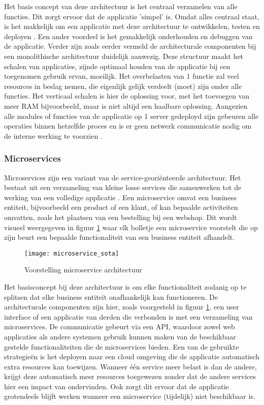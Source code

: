 Het basis concept van deze architectuur is het centraal verzamelen van alle functies. Dit zorgt ervoor dat de applicatie 'simpel' is. Omdat alles centraal staat, is het makkelijk om een applicatie met deze architectuur te ontwikkelen, testen en deployen \autocite{Hou2023}. Een ander voordeel is het gemakkelijk onderhouden en debuggen van de applicatie. Verder zijn zoals eerder vermeld de architecturale componenten bij een monolithische architectuur duidelijk aanwezig. Deze structuur maakt het schalen van applicaties, zijnde optimaal houden van de applicatie bij een toegenomen gebruik ervan, moeilijk. Het overbelasten van 1 functie zal veel resources in beslag nemen, die eigenlijk gelijk verdeelt (moet) zijn onder alle functies. Het verticaal schalen is hier de oplossing voor, met het toevoegen van meer RAM bijvoorbeeld, maar is niet altijd een haalbare oplossing. Aangezien alle modules of functies van de applicatie op 1 server gedeployd zijn gebeuren alle operaties binnen hetzelfde proces en is er geen netwerk communicatie nodig om de interne werking te voorzien \autocite{Ozkaya2023}. 


\subsubsection{Microservices}
Microservices zijn een variant van de service-georiënteerde architectuur. Het bestaat uit een verzameling van kleine losse services die samenwerken tot de werking van een volledige applicatie \autocite{Megargel2020}. Een microservice omvat een business entiteit, bijvoorbeeld een product of een klant, of kan bepaalde activiteiten omvatten, zoals het plaatsen van een bestelling bij een webshop. Dit wordt visueel weergegeven in figuur \ref{microservice_sota} waar elk bolletje een microservice voorstelt die op zijn beurt een bepaalde functionaliteit van een business entiteit afhandelt.\\

\begin{figure}[H]
    \texttt{[image: microservice\_sota]}
    \caption{Voorstelling microservice architectuur \autocite{Megargel2020}}
    \label{microservice_sota}
\end{figure}

Het basisconcept bij deze architectuur is om elke functionaliteit zodanig op te splitsen dat elke business entiteit onafhankelijk kan functioneren. De architecturale componenten zijn hier, zoals voorgesteld in figuur \ref{microservice_sota}, een user interface of een applicatie van derden die verbonden is met een verzameling van microservices. De communicatie gebeurt via een API, waardoor zowel web applicaties als andere systemen gebruik kunnen maken van de beschikbaar gestelde functionaliteiten die de microservices bieden. Een van de gebruikte strategieën is het deployen naar een cloud omgeving die de applicatie automatisch extra resources kan toewijzen. Wanneer één service meer belast is dan de andere, krijgt deze automatisch meer resources toegewezen zonder dat de andere services hier een impact van ondervinden. Ook zorgt dit ervoor dat de applicatie grotendeels blijft werken wanneer een microservice (tijdelijk) niet beschikbaar is.

